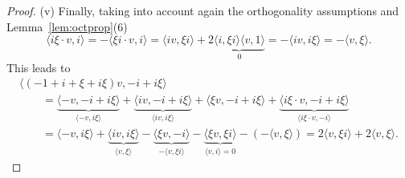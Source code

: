 \documentclass[10pt,a4paper]{amsart}
\numberwithin{equation}{section}
\begin{document}
\begin{proof}
(v) Finally, taking into account again the orthogonality assumptions and Lemma~\ref{lem:octprop}(6)
 \[ \langle i\xi\cdot v,i\rangle= - \langle \xi i\cdot v,i\rangle =\langle iv,\xi i \rangle+ 2\underbrace{ \langle i,\xi i \rangle \langle v,1 \rangle}_{0}=-\langle iv,i\xi \rangle=-\langle v,\xi \rangle.\]
 This leads to
 \begin{gather}
 \langle (-1+i+\xi+i\xi)v, -i+i\xi \rangle \nonumber \\
 \qquad{}= \underbrace{\langle -v, -i+i\xi \rangle}_{\langle -v, i\xi \rangle} + \underbrace{\langle iv,-i+i\xi \rangle}_{\langle iv,i\xi \rangle} + \langle \xi v,-i+i\xi \rangle+ \underbrace{\langle i\xi\cdot v, -i+i\xi \rangle}_{\langle i\xi\cdot v, -i \rangle} \nonumber\\
 \qquad{}= \langle -v, i\xi \rangle+\underbrace{\langle iv,i\xi \rangle}_{\langle v,\xi \rangle}-\underbrace{\langle \xi v,-i \rangle}_{-\langle v,\xi i \rangle}-\underbrace{\langle \xi v,\xi i \rangle}_{\langle v,i \rangle = 0}-(-\langle v,\xi \rangle)=2 \langle v, \xi i \rangle+2\langle v,\xi \rangle.
 \label{eq:gxginvst5}
 \end{gather}


\end{proof}
\end{document}
